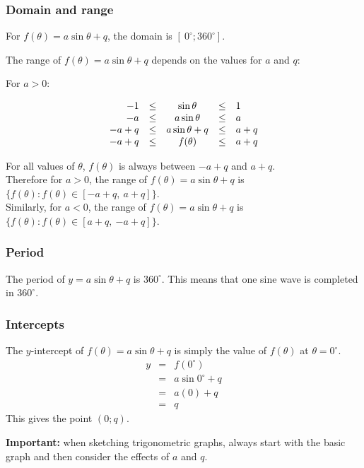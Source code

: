 \subsubsection*{Domain and range}
\nopagebreak
For $f(\theta) = a\sin\theta + q$, the domain is $[~0^{\circ}; 360^{\circ}]$. \par
The range of $f(\theta )=a\sin\theta +q$ depends on the values for $a$ and $q$:\par 
For $a>0$:\par 
\nopagebreak\noindent{}
\begin{equation*}
  \begin{array}{rcccl}
    \hfill   -1 & \leq &  \sin\theta     & \leq & 1   \hfill \\
    \hfill   -a & \leq & a\sin\theta     & \leq & a   \hfill \\
    \hfill -a+q & \leq & a\sin\theta + q & \leq & a+q \hfill \\
    \hfill -a+q & \leq &  f(\theta)      & \leq & a+q \hfill 
  \end{array}
\end{equation*}
\par
For all values of $\theta$, $f(\theta)$ is always between $-a+q$ and
$a+q$.\\

Therefore for $a>0$, the range of $f(\theta )=a\sin\theta +q$ is
$\{f(\theta ):f(\theta )\in [-a+q,~a+q]\}$.\\

Similarly, for $a<0$, the range of $f(\theta )=a\sin\theta +q$ is
$\{f(\theta ):f(\theta )\in [a+q,~{-a}+q]\}$.



\subsubsection*{Period}
The period of $y=a\sin\theta+q$ is $360^{\circ}$. This means that one sine wave is completed in $360^{\circ}$. 

\subsubsection*{Intercepts}
\nopagebreak
The $y$-intercept of $f(\theta )=a\sin\theta+q$ is simply the value of $f(\theta )$ at $\theta =0^{\circ }$.
\begin{eqnarray*}
  y & = & f(0^{\circ }) \\
    & = & a\sin 0^{\circ } + q \\
    & = & a(0) + q \\
    & = & q
\end{eqnarray*}
This gives the point $(0;q)$.
\par
\textbf{Important:} when sketching trigonometric graphs, always start with the basic graph and then consider the effects of $a$ and $q$.

